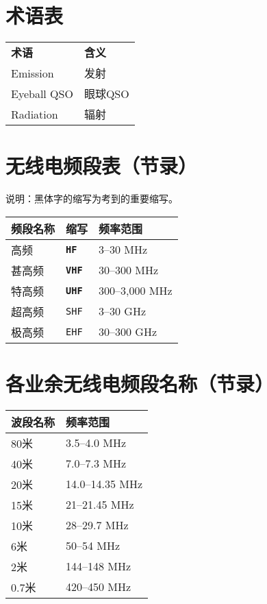 \section{术语表}

\begin{longtable}[l]{ll}
	\textbf{术语} & \textbf{含义} \\
	Emission & 发射 \\
	Eyeball QSO & 眼球QSO \\
	Radiation & 辐射 \\
\end{longtable}

\newpage

\section{无线电频段表（节录）}

说明：黑体字的缩写为考到的重要缩写。

\begin{longtable}{|l|l|l|}
	\hline
	\textbf{频段名称} & \textbf{缩写} & \textbf{频率范围} \\
	\hline
	高频 & \texttt{\textbf{HF}} & 3–30 \si{\MHz} \\
	\hline
	甚高频 & \texttt{\textbf{VHF}} & 30–300 \si{\MHz} \\
	\hline
	特高频 & \texttt{\textbf{UHF}} & 300–3,000 \si{\MHz} \\
	\hline
	超高频 & \texttt{SHF} & 3–30 \si{\GHz} \\
	\hline
	极高频 & \texttt{EHF} & 30–300 \si{\GHz} \\
	\hline
\end{longtable}

\newpage






\section{各业余无线电频段名称（节录）}


\begin{longtable}{|l|l|}
	\hline
	\textbf{波段名称} & \textbf{频率范围} \\
	\hline
	80米 & 3.5–4.0 \si{\MHz} \\
	\hline
	40米 & 7.0–7.3 \si{\MHz} \\
	\hline
	20米 & 14.0–14.35 \si{\MHz} \\
	\hline
	15米 & 21–21.45 \si{\MHz} \\
	\hline
	10米 & 28–29.7 \si{\MHz} \\
	\hline
	6米 & 50–54 \si{\MHz} \\
	\hline
	2米 & 144–148 \si{\MHz} \\
	\hline
	0.7米 & 420–450 \si{\MHz} \\
	\hline
\end{longtable}

